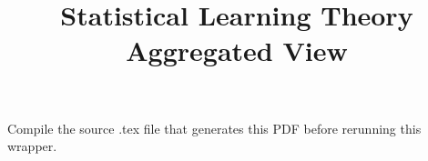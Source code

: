 \documentclass[11pt,a4paper]{article}
\title{Statistical Learning Theory \textendash{} Aggregated View}
\date{}
\begin{document}
\maketitle
\noindent Compile the source .tex file that generates this PDF before rerunning this wrapper.


\end{document}
